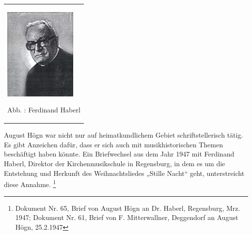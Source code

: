 \documentclass[a4paper]{article}
\newcounter{Abb}
\renewcommand\theAbb{\arabic{Abb}}
\begin{document}
\begin{flushleft}
\tablefirsthead{}
\tablehead{}
\tabletail{}
\tablelasttail{}
\begin{supertabular}{m{3.7879999cm}}

\begin{center}

\includegraphics[width=3.605cm,height=4.6cm]{pictures/zulassungsarbeit-img045.jpg}

\end{center}
Abb. \stepcounter{Abb}{\theAbb}: Ferdinand Haberl\\
\end{supertabular}
\end{flushleft}
August Högn war nicht nur auf heimatkundlichem Gebiet schriftstellerisch
tätig. Es gibt Anzeichen dafür, dass er sich auch mit musikhistorischen
Themen beschäftigt haben könnte. Ein Briefwechsel aus dem Jahr 1947 mit
Ferdinand Haberl, Direktor der Kirchenmusikschule in Regensburg, in dem
es um die Entstehung und Herkunft des Weihnachtsliedes „Stille Nacht“
geht, unterstreicht diese Annahme. \footnote{Dokument Nr. 65, Brief von
August Högn an Dr. Haberl, Regensburg, Mrz. 1947; Dokument Nr. 61,
Brief von F. Mitterwallner, Deggendorf an August Högn, 25.2.1947}
\end{document}
